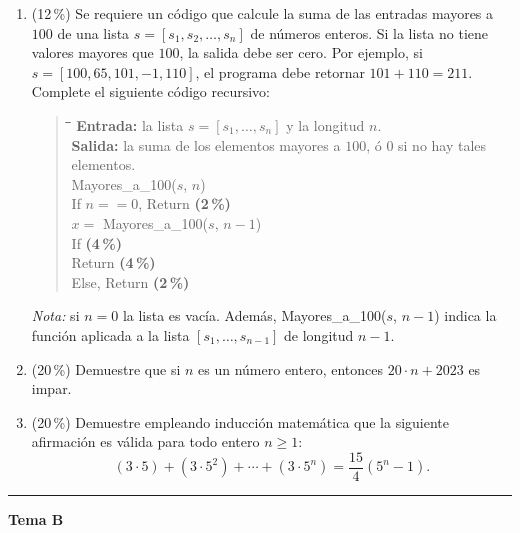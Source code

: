 \documentclass[11pt]{article}
\newenvironment{pseudo}{%
  \begin{quote}\ttfamily\small\begin{tabbing}
  \hspace{2em}\=\hspace{2em}\=\hspace{2em}\=\hspace{2em}\=\kill}{%
  \end{tabbing}\end{quote}}
\begin{document}
\begin{enumerate}
\item (12\,\%) Se requiere un código que calcule la suma de las entradas mayores a $100$ de una lista $s = [s_1, s_2, \dots, s_n]$ de números enteros. Si la lista no tiene valores mayores que $100$, la salida debe ser cero. Por ejemplo, si $s = [100, 65, 101, -1, 110]$, el programa debe retornar $101 + 110 = 211$. Complete el siguiente código recursivo:
\begin{pseudo}
\textbf{Entrada:} la lista $s = [s_1, \dots, s_n]$ y la longitud $n$.\\
\textbf{Salida:} la suma de los elementos mayores a $100$, ó $0$ si no hay tales elementos.\\[2pt]
Mayores\_a\_100($s$, $n$)\\
\>If $n == 0$, Return \underline{\hspace{2cm}} \quad\textbf{(2\,\%)}\\
\>$x = $ Mayores\_a\_100($s$, $n-1$)\\
\>If \underline{\hspace{3cm}} \quad\textbf{(4\,\%)}\\
\>\>Return \underline{\hspace{3cm}} \quad\textbf{(4\,\%)}\\
\>Else, Return \underline{\hspace{2cm}} \quad\textbf{(2\,\%)}
\end{pseudo}
\emph{Nota:} si $n = 0$ la lista es vacía. Además, Mayores\_a\_100($s$, $n-1$) indica la función aplicada a la lista $[s_1, \dots, s_{n-1}]$ de longitud $n-1$.

\item (20\,\%) Demuestre que si $n$ es un número entero, entonces $20 \cdot n + 2023$ es impar.

\item (20\,\%) Demuestre empleando inducción matemática que la siguiente afirmación es válida para todo entero $n \geq 1$:
\[
(3 \cdot 5) + (3 \cdot 5^2) + \cdots + (3 \cdot 5^n) = \frac{15}{4}(5^n - 1).
\]
\end{enumerate}

\bigskip\hrule\medskip
\begin{center}\bfseries\large Tema B\end{center}
\end{document}
